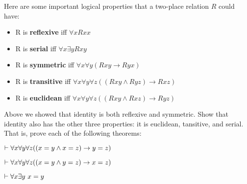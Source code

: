 



\practiceproblems

\problempart Here are some important logical properties that a two-place relation $R$ could have:

\begin{itemize}
\item[] R is \textbf{reflexive} iff $\forall x Rxx$
\item[] R is \textbf{serial} iff $\forall x \exists y Rxy$
\item[] R is \textbf{symmetric} iff $\forall x \forall y(Rxy \rightarrow Ryx)$
\item[] R is \textbf{transitive} iff $\forall x \forall y \forall z((Rxy \land Ryz) \rightarrow Rxz)$
\item[] R is \textbf{euclidean} iff $\forall x \forall y \forall z((Rxy \land Rxz) \rightarrow Ryz)$
\end{itemize}

\noindent Above we showed that identity is both reflexive and symmetric.  Show that identity also has the other three properties: it is euclidean, tansitive, and serial.  That is, prove each of the following theorems:

\begin{earg}
\item $\vdash \forall x \forall y \forall z((x=y \land x=z) \rightarrow y = z)$
\item $\vdash \forall x \forall y \forall z((x=y \land y = z) \rightarrow x = z)$
\item $\vdash \forall x \exists y \ x = y$
\end{earg}





